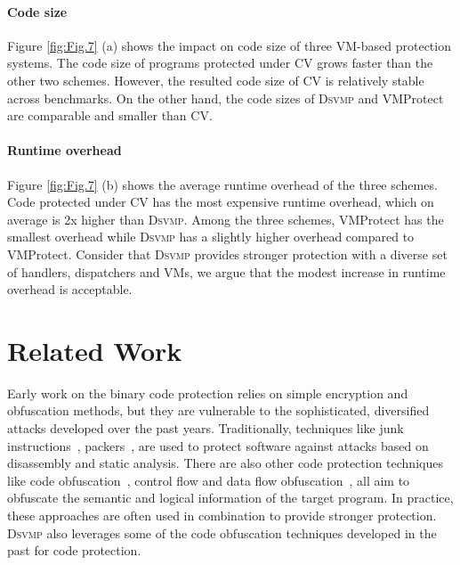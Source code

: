 \documentclass[conference]{IEEEtran}
\newcommand{\DSVMP}{\textsc{Dsvmp}\xspace}
\begin{document}
\paragraph*{Code size} Figure \ref{fig:Fig.7} (a) shows the impact on code size of three VM-based protection systems. The code size of programs protected under CV grows faster than the other two schemes. However, the resulted code size of CV is relatively stable across benchmarks. On the other hand, the code sizes of \DSVMP and VMProtect are comparable and smaller than CV.


\paragraph*{Runtime overhead}
Figure \ref{fig:Fig.7} (b) shows the average runtime overhead of the three schemes. Code protected under CV has the most expensive runtime overhead, which on average is 2x higher than \DSVMP. Among the three schemes, VMProtect has the smallest overhead while \DSVMP has a slightly higher overhead compared to VMProtect.
Consider that \DSVMP provides stronger protection with a diverse set of handlers, dispatchers and VMs, we argue that the modest increase in runtime overhead is acceptable.


\section{Related Work}
Early work on the binary code protection relies on simple encryption and obfuscation methods, but they are vulnerable to the sophisticated, diversified attacks developed over the past years.
Traditionally, techniques like junk instructions~\cite{23linn2003obfuscation}, packers~\cite{25Execryptor,26upx}, are used to protect software against attacks based on disassembly and static analysis.
There are also other code protection techniques like code obfuscation~\cite{25wu2010mimimorphism}, control flow and data flow obfuscation~\cite{13liem2008compiler,27ge2005control,27balachandran2014function},  all aim to obfuscate the semantic and logical information of the target program.
In practice, these approaches are often used in combination to provide stronger protection. \DSVMP also leverages some of the code obfuscation techniques developed in the past for code protection.
\end{document}
